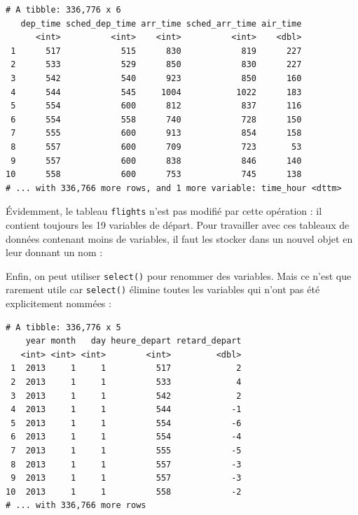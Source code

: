 \documentclass[
  a4paper,
]{article}
\newenvironment{Shaded}{\begin{snugshade}}{\end{snugshade}}
\newcommand{\DataTypeTok}[1]{\textcolor[rgb]{0.00,0.34,0.68}{#1}}
\newcommand{\KeywordTok}[1]{\textcolor[rgb]{0.12,0.11,0.11}{\textbf{#1}}}
\newcommand{\NormalTok}[1]{\textcolor[rgb]{0.12,0.11,0.11}{#1}}
\newcommand{\OperatorTok}[1]{\textcolor[rgb]{0.12,0.11,0.11}{#1}}
\newcommand{\StringTok}[1]{\textcolor[rgb]{0.75,0.01,0.01}{#1}}
\begin{document}
\begin{verbatim}
# A tibble: 336,776 x 6
   dep_time sched_dep_time arr_time sched_arr_time air_time
      <int>          <int>    <int>          <int>    <dbl>
 1      517            515      830            819      227
 2      533            529      850            830      227
 3      542            540      923            850      160
 4      544            545     1004           1022      183
 5      554            600      812            837      116
 6      554            558      740            728      150
 7      555            600      913            854      158
 8      557            600      709            723       53
 9      557            600      838            846      140
10      558            600      753            745      138
# ... with 336,766 more rows, and 1 more variable: time_hour <dttm>
\end{verbatim}

Évidemment, le tableau \texttt{flights} n'est pas modifié par cette opération : il contient toujours les 19 variables de départ. Pour travailler avec ces tableaux de données contenant moins de variables, il faut les stocker dans un nouvel objet en leur donnant un nom :

\begin{Shaded}
\end{Shaded}

Enfin, on peut utiliser \texttt{select()} pour renommer des variables. Mais ce n'est que rarement utile car \texttt{select()} élimine toutes les variables qui n'ont pas été explicitement nommées :

\begin{Shaded}
\end{Shaded}

\begin{verbatim}
# A tibble: 336,776 x 5
    year month   day heure_depart retard_depart
   <int> <int> <int>        <int>         <dbl>
 1  2013     1     1          517             2
 2  2013     1     1          533             4
 3  2013     1     1          542             2
 4  2013     1     1          544            -1
 5  2013     1     1          554            -6
 6  2013     1     1          554            -4
 7  2013     1     1          555            -5
 8  2013     1     1          557            -3
 9  2013     1     1          557            -3
10  2013     1     1          558            -2
# ... with 336,766 more rows
\end{verbatim}
\end{document}
